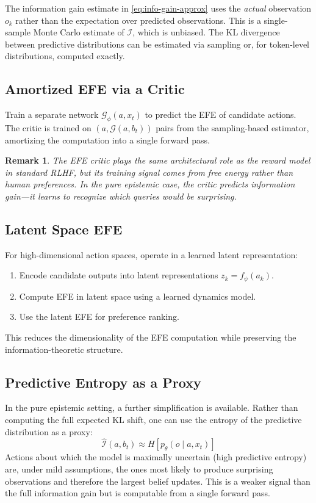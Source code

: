 \documentclass[11pt]{article}
\newtheorem{remark}{Remark}
\newcommand{\EFE}{\mathcal{G}}
\begin{document}
The information gain estimate in \cref{eq:info-gain-approx} uses the \emph{actual} observation $o_k$ rather than the expectation over predicted observations. This is a single-sample Monte Carlo estimate of $\mathcal{I}$, which is unbiased. The KL divergence between predictive distributions can be estimated via sampling or, for token-level distributions, computed exactly.

\subsection{Amortized EFE via a Critic}

Train a separate network $\EFE_\phi(a, x_t)$ to predict the EFE of candidate actions. The critic is trained on $(a, \EFE(a, b_t))$ pairs from the sampling-based estimator, amortizing the computation into a single forward pass.

\begin{remark}
The EFE critic plays the same architectural role as the reward model in standard RLHF, but its training signal comes from free energy rather than human preferences. In the pure epistemic case, the critic predicts information gain---it learns to recognize which queries would be surprising.
\end{remark}

\subsection{Latent Space EFE}

For high-dimensional action spaces, operate in a learned latent representation:
\begin{enumerate}
    \item Encode candidate outputs into latent representations $z_k = f_\psi(a_k)$.
    \item Compute EFE in latent space using a learned dynamics model.
    \item Use the latent EFE for preference ranking.
\end{enumerate}
This reduces the dimensionality of the EFE computation while preserving the information-theoretic structure.

\subsection{Predictive Entropy as a Proxy}

In the pure epistemic setting, a further simplification is available. Rather than computing the full expected KL shift, one can use the entropy of the predictive distribution as a proxy:
\begin{equation}
\label{eq:entropy-proxy}
\hat{\mathcal{I}}(a, b_t) \approx H\!\left[p_\theta(o \mid a, x_t)\right]
\end{equation}
Actions about which the model is maximally uncertain (high predictive entropy) are, under mild assumptions, the ones most likely to produce surprising observations and therefore the largest belief updates. This is a weaker signal than the full information gain but is computable from a single forward pass.
\end{document}
